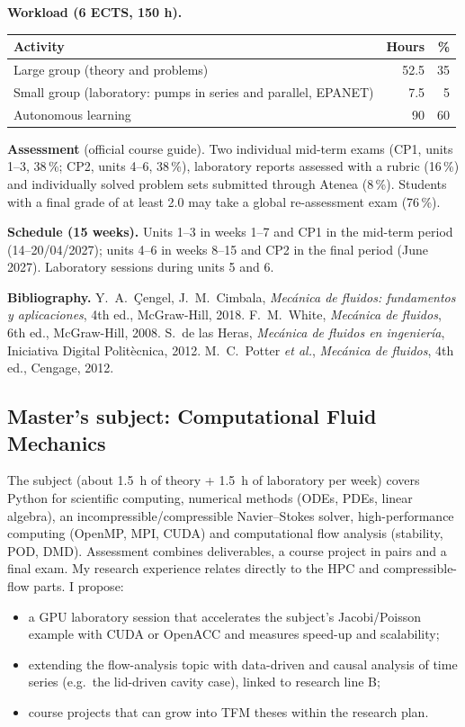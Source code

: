 \documentclass[11pt]{article}
\begin{document}
\textbf{Workload (6 ECTS, 150 h).}
\begin{center}\small
\begin{tabular}{@{}lrr@{}}
\toprule
Activity & Hours & \% \\ \midrule
Large group (theory and problems) & 52.5 & 35 \\
Small group (laboratory: pumps in series and parallel, EPANET) & 7.5 & 5 \\
Autonomous learning & 90 & 60 \\ \bottomrule
\end{tabular}
\end{center}

\textbf{Assessment} (official course guide). Two individual mid-term exams (CP1, units 1--3,
38\,\%; CP2, units 4--6, 38\,\%), laboratory reports assessed with a rubric (16\,\%) and
individually solved problem sets submitted through Atenea (8\,\%). Students with a final
grade of at least 2.0 may take a global re-assessment exam (76\,\%).

\textbf{Schedule (15 weeks).} Units 1--3 in weeks 1--7 and CP1 in the mid-term period
(14--20/04/2027); units 4--6 in weeks 8--15 and CP2 in the final period (June 2027).
Laboratory sessions during units 5 and 6.

\textbf{Bibliography.} Y.\ A.\ \c{C}engel, J.\ M.\ Cimbala, \emph{Mec\'anica de fluidos:
fundamentos y aplicaciones}, 4th ed., McGraw-Hill, 2018. F.\ M.\ White, \emph{Mec\'anica
de fluidos}, 6th ed., McGraw-Hill, 2008. S.\ de las Heras, \emph{Mec\'anica de fluidos en
ingenier\'ia}, Iniciativa Digital Polit\`ecnica, 2012. M.\ C.\ Potter \emph{et al.},
\emph{Mec\'anica de fluidos}, 4th ed., Cengage, 2012.

\subsection{Master's subject: Computational Fluid Mechanics}\label{sec:cfm}
The subject (about 1.5~h of theory + 1.5~h of laboratory per week) covers Python for
scientific computing, numerical methods (ODEs, PDEs, linear algebra), an
incompressible/compressible Navier--Stokes solver, high-performance computing (OpenMP, MPI,
CUDA) and computational flow analysis (stability, POD, DMD). Assessment combines
deliverables, a course project in pairs and a final exam. My research experience relates
directly to the HPC and compressible-flow parts. I propose:
\begin{itemize}
\item a GPU laboratory session that accelerates the subject's Jacobi/Poisson example with
CUDA or OpenACC and measures speed-up and scalability;
\item extending the flow-analysis topic with data-driven and causal analysis of time
series (e.g.\ the lid-driven cavity case), linked to research line B;
\item course projects that can grow into TFM theses within the research plan.
\end{itemize}
\end{document}
